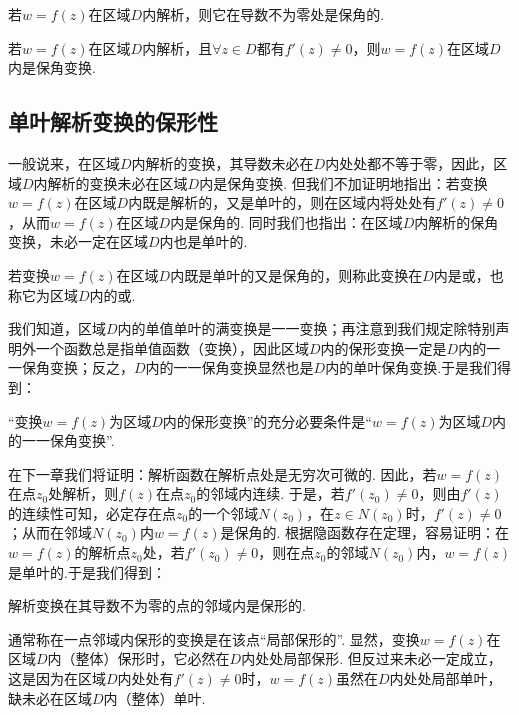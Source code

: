 \begin{theorem}
若\(w = f(z)\)在区域\(D\)内解析，则它在导数不为零处是保角的.
\end{theorem}

\begin{corollary}
若\(w = f(z)\)在区域\(D\)内解析，且\(\forall z \in D\)都有\(f'(z) \neq 0\)，则\(w = f(z)\)在区域\(D\)内是保角变换.
\end{corollary}

\subsection{单叶解析变换的保形性}
一般说来，在区域\(D\)内解析的变换，其导数未必在\(D\)内处处都不等于零，因此，区域\(D\)内解析的变换未必在区域\(D\)内是保角变换.
但我们不加证明地指出：若变换\(w = f(z)\)在区域\(D\)内既是解析的，又是单叶的，则在区域内将处处有\(f'(z)\neq0\)，从而\(w = f(z)\)在区域\(D\)内是保角的.
同时我们也指出：在区域\(D\)内解析的保角变换，未必一定在区域\(D\)内也是单叶的.

\begin{definition}
若变换\(w = f(z)\)在区域\(D\)内既是单叶的又是保角的，则称此变换在\(D\)内是或，也称它为区域\(D\)内的或.
\end{definition}

我们知道，区域\(D\)内的单值单叶的满变换是一一变换；再注意到我们规定除特别声明外一个函数总是指单值函数（变换），因此区域\(D\)内的保形变换一定是\(D\)内的一一保角变换；反之，\(D\)内的一一保角变换显然也是\(D\)内的单叶保角变换.于是我们得到：
\begin{property}
“变换\(w = f(z)\)为区域\(D\)内的保形变换”的充分必要条件是“\(w = f(z)\)为区域\(D\)内的一一保角变换”.
\end{property}
在下一章我们将证明：解析函数在解析点处是无穷次可微的.
因此，若\(w = f(z)\)在点\(z_0\)处解析，则\(f(z)\)在点\(z_0\)的邻域内连续.
于是，若\(f'(z_0)\neq0\)，则由\(f'(z)\)的连续性可知，必定存在点\(z_0\)的一个邻域\(N(z_0)\)，在\(z \in N(z_0)\)时，\(f'(z)\neq0\)；从而在邻域\(N(z_0)\)内\(w = f(z)\)是保角的.
根据隐函数存在定理，容易证明：在\(w = f(z)\)的解析点\(z_0\)处，若\(f'(z_0)\neq0\)，则在点\(z_0\)的邻域\(N(z_0)\)内，\(w = f(z)\)是单叶的.于是我们得到：
\begin{theorem}
解析变换在其导数不为零的点的邻域内是保形的.
\end{theorem}

通常称在一点邻域内保形的变换是在该点“局部保形的”.
显然，变换\(w = f(z)\)在区域\(D\)内（整体）保形时，它必然在\(D\)内处处局部保形.
但反过来未必一定成立，这是因为在区域\(D\)内处处有\(f'(z)\neq0\)时，\(w = f(z)\)虽然在\(D\)内处处局部单叶，缺未必在区域\(D\)内（整体）单叶.

